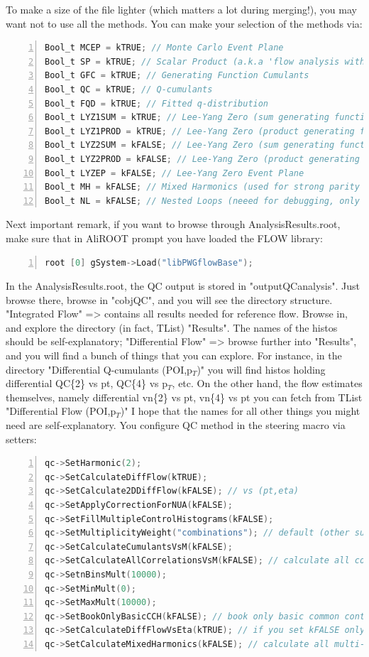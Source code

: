 \documentclass[a4paper]{book}
\numberwithin{equation}{subsection}
\begin{document}
 To make a size of the file lighter (which matters a lot during merging!), you may want not to use all the methods. You can make your selection of the methods via:
 	\begin{lstlisting}[language=C, numbers=left]
Bool_t MCEP = kTRUE; // Monte Carlo Event Plane
Bool_t SP = kTRUE; // Scalar Product (a.k.a 'flow analysis with eta gaps')
Bool_t GFC = kTRUE; // Generating Function Cumulants
Bool_t QC = kTRUE; // Q-cumulants
Bool_t FQD = kTRUE; // Fitted q-distribution
Bool_t LYZ1SUM = kTRUE; // Lee-Yang Zero (sum generating function), first pass over the data
Bool_t LYZ1PROD = kTRUE; // Lee-Yang Zero (product generating function), first pass over the data
Bool_t LYZ2SUM = kFALSE; // Lee-Yang Zero (sum generating function), second pass over the data
Bool_t LYZ2PROD = kFALSE; // Lee-Yang Zero (product generating function), second pass over the data
Bool_t LYZEP = kFALSE; // Lee-Yang Zero Event Plane
Bool_t MH = kFALSE; // Mixed Harmonics (used for strong parity violation studies) 
Bool_t NL = kFALSE; // Nested Loops (neeed for debugging, only for developers) 	\end{lstlisting}
 Next important remark, if you want to browse through AnalysisResults.root, make sure that in AliROOT prompt you have loaded the FLOW library:
 	\begin{lstlisting}[language=C, numbers=left]
root [0] gSystem->Load("libPWGflowBase"); 	\end{lstlisting}
 In the AnalysisResults.root, the QC output is stored in "outputQCanalysis". Just browse there, browse in "cobjQC", and you will see the directory structure.
 "Integrated Flow" => contains all results needed for reference flow. Browse in, and explore the directory (in fact, TList) "Results". The names of the histos should be self-explanatory;
 "Differential Flow" => browse further into "Results", and you will find a bunch of things that you can explore. For instance, in the directory "Differential Q-cumulants (POI,p$_{T}$)" you will find histos holding differential QC\{2\} vs pt, QC\{4\} vs p$_{T}$, etc. On the other hand, the flow estimates themselves, namely differential vn\{2\} vs pt, vn\{4\} vs pt you can fetch from TList "Differential Flow (POI,p$_{T}$)"
 I hope that the names for all other things you might need are self-explanatory. 
 You configure QC method in the steering macro via setters:
 	\begin{lstlisting}[language=C, numbers=left]
qc->SetHarmonic(2);
qc->SetCalculateDiffFlow(kTRUE);
qc->SetCalculate2DDiffFlow(kFALSE); // vs (pt,eta)
qc->SetApplyCorrectionForNUA(kFALSE);
qc->SetFillMultipleControlHistograms(kFALSE); 
qc->SetMultiplicityWeight("combinations"); // default (other supported options are "unit" and "multiplicity")
qc->SetCalculateCumulantsVsM(kFALSE);
qc->SetCalculateAllCorrelationsVsM(kFALSE); // calculate all correlations in mixed harmonics "vs M"
qc->SetnBinsMult(10000);
qc->SetMinMult(0);
qc->SetMaxMult(10000); 
qc->SetBookOnlyBasicCCH(kFALSE); // book only basic common control histograms
qc->SetCalculateDiffFlowVsEta(kTRUE); // if you set kFALSE only differential flow vs pt is calculated
qc->SetCalculateMixedHarmonics(kFALSE); // calculate all multi-partice mixed-harmonics correlators	\end{lstlisting}
\end{document}
